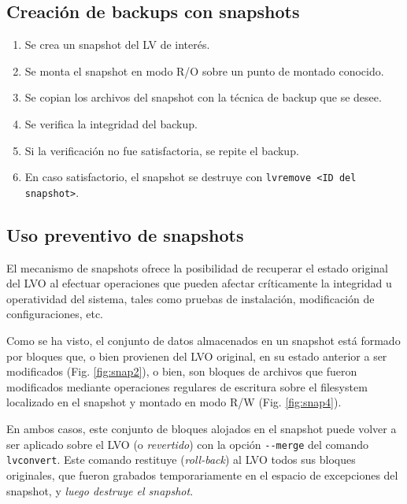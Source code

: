 \subsection {Creación de backups con snapshots}
\begin{enumerate}
	\item Se crea un snapshot del LV de interés.
	\item Se monta el snapshot en modo R/O sobre un punto de montado conocido. 
	\item Se copian los archivos del snapshot con la técnica de backup que se desee. 
	\item Se verifica la integridad del backup.
	\item Si la verificación no fue satisfactoria, se repite el backup.
	\item En caso satisfactorio, el snapshot se destruye con \lstinline$lvremove <ID del snapshot>$.  

\end{enumerate}

\begin {comment}
--------------------------------------------
, en un momento en que el filesystem esté en estado consistente (por ejemplo, al arranque del sistema, mientras aún no ha sido montado, o mientras los servicios están administrativamente detenidos).
--------------------------------------------
\end{comment}

\subsection{Uso preventivo de snapshots}
El mecanismo de snapshots ofrece la posibilidad de recuperar el estado original del LVO al efectuar operaciones que pueden afectar críticamente la integridad u operatividad del sistema, tales como pruebas de instalación, modificación de configuraciones, etc. 

Como se ha visto, el conjunto de datos almacenados en un snapshot está formado por bloques que, o bien provienen del LVO original, en su estado anterior a ser modificados (Fig. \ref{fig:snap2}), o bien, son bloques de archivos que fueron modificados mediante operaciones regulares de escritura sobre el filesystem localizado en el snapshot y montado en modo R/W (Fig. \ref{fig:snap4}). 

En ambos casos, este conjunto de bloques alojados en el snapshot puede volver a ser aplicado sobre el LVO (o \emph{revertido}) con la opción \lstinline$--merge$ del comando \lstinline$lvconvert$. Este comando restituye (\emph{roll-back}) al LVO todos sus bloques originales, que fueron grabados temporariamente en el espacio de excepciones del snapshot, y \emph{luego destruye el snapshot}. 

